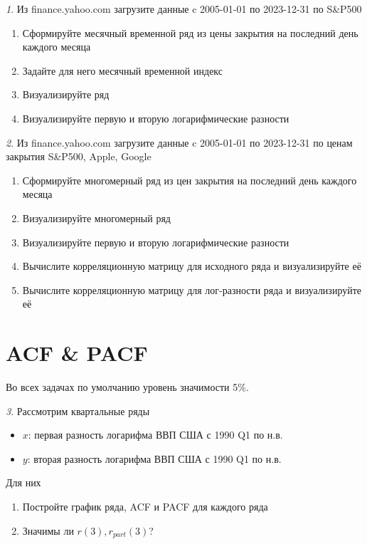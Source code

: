 \documentclass[12pt]{article}
\theoremstyle{remark}
\newtheorem{exercise}{}[subsection]
\begin{document}
\begin{exercise}
Из finance.yahoo.com загрузите данные c 2005-01-01 по 2023-12-31 по S\&P500
\begin{enumerate}
	\item Сформируйте месячный временной ряд из цены закрытия на последний день каждого месяца
	\item Задайте для него месячный временной индекс
	\item Визуализируйте ряд
	\item Визуализируйте первую и вторую логарифмические разности
\end{enumerate}
\end{exercise}

\begin{exercise}
Из finance.yahoo.com загрузите данные c 2005-01-01 по 2023-12-31 по
ценам закрытия S\&P500, Apple, Google
\begin{enumerate}
	\item Сформируйте многомерный ряд из цен закрытия на последний день каждого месяца
	\item Визуализируйте многомерный ряд
	\item Визуализируйте первую и вторую логарифмические разности
	\item Вычислите корреляционную матрицу для исходного ряда и визуализируйте её
	\item Вычислите корреляционную матрицу для лог-разности ряда и визуализируйте её
\end{enumerate}
\end{exercise}

\section{ACF \& PACF}

Во всех задачах по умолчанию уровень значимости 5\%.

\begin{exercise}
Рассмотрим квартальные ряды
\begin{itemize}
	\item \(x\): первая разность логарифма ВВП США с 1990 Q1 по н.в.
	\item \(y\): вторая разность логарифма ВВП США с 1990 Q1 по н.в.
\end{itemize}
Для них
\begin{enumerate}
	\item Постройте график ряда, ACF и PACF для каждого ряда
	\item Значимы ли \(r(3),r_{part}(3)\)?
\end{enumerate}
\end{exercise}
\end{document}
